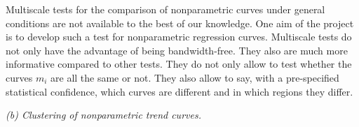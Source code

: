 \documentclass[a4paper,12pt]{article}
\begin{document}
Multiscale tests for the comparison of nonparametric curves under general conditions are not available to the best of our knowledge. One aim of the project is to develop such a test for nonparametric regression curves. Multiscale tests do not only have the advantage of being bandwidth-free. They also are much more informative compared to other tests. They do not only allow to test whether the curves $m_i$ are all the same or not. They also allow to say, with a pre-specified statistical confidence, which curves are different and in which regions they differ.  
\vspace{15pt}


\noindent \textit{(b) Clustering of nonparametric trend curves. } 
\vspace{10pt} 



\end{document}
